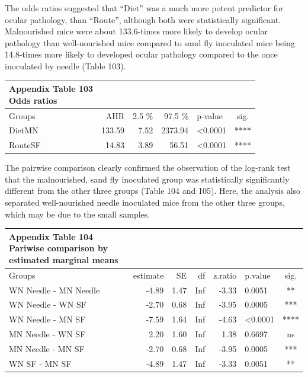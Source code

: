 \documentclass[
  12pt,
  letterpaper,
]{article}
\begin{document}
The odds ratios suggested that ``Diet'' was a much more potent predictor for ocular pathology, than ``Route'', although both were statistically significant. Malnourished mice were about 133.6-times more likely to develop ocular pathology than well-nourished mice compared to sand fly inoculated mice being 14.8-times more likely to developed ocular pathology compared to the once inoculated by needle (Table 103).

\begin{longtable}{l|rrrlc}
\caption*{
{\large \textbf{Appendix Table 103}} \\ 
{\small \textbf{Odds ratios}}
} \\ 
\toprule
\multicolumn{1}{l}{Groups} & AHR & 2.5 \% & 97.5 \% & p-value & sig. \\ 
\midrule\addlinespace[2.5pt]
DietMN & 133.59 & 7.52 & 2373.94 & <0.0001 & **** \\ 
RouteSF & 14.83 & 3.89 & 56.51 & <0.0001 & **** \\ 
\bottomrule
\end{longtable}

The pairwise comparison clearly confirmed the observation of the log-rank test that the malnourished, sand fly inoculated group was statistically significantly different from the other three groups (Table 104 and 105). Here, the analysis also separated well-nourished needle inoculated mice from the other three groups, which may be due to the small samples.

\begin{longtable}{l|rrrrlc}
\caption*{
{\large \textbf{Appendix Table 104}} \\ 
{\small \textbf{Pariwise comparison by estimated marginal means}}
} \\ 
\toprule
\multicolumn{1}{l}{Groups} & estimate & SE & df & z.ratio & p.value & sig. \\ 
\midrule\addlinespace[2.5pt]
WN Needle - MN Needle & -4.89 & 1.47 & Inf & -3.33 & 0.0051 & ** \\ 
WN Needle - WN SF & -2.70 & 0.68 & Inf & -3.95 & 0.0005 & *** \\ 
WN Needle - MN SF & -7.59 & 1.64 & Inf & -4.63 & <0.0001 & **** \\ 
MN Needle - WN SF & 2.20 & 1.60 & Inf & 1.38 & 0.6697 & ns \\ 
MN Needle - MN SF & -2.70 & 0.68 & Inf & -3.95 & 0.0005 & *** \\ 
WN SF - MN SF & -4.89 & 1.47 & Inf & -3.33 & 0.0051 & ** \\ 
\bottomrule
\end{longtable}
\end{document}
